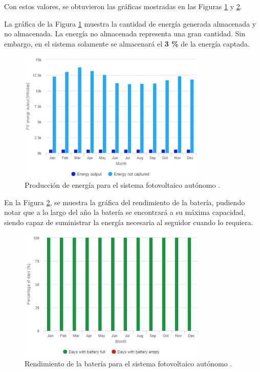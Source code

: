 \begin{itemize}
	Con estos valores, se obtuvieron las gráficas mostradas en las Figuras \ref{fig:batgraf1} y \ref{fig:batgraf2}.
	
	
	La gráfica de la Figura \ref{fig:batgraf1} muestra la cantidad de energía generada almacenada y no almacenada. La energía no almacenada representa una gran cantidad. Sin embargo, en el sistema solamente se almacenará el \textbf{3 \%} de la energía captada. 
	
	\begin{figure}[H]
		\centering
		\includegraphics[width=9cm]{imagenes/batgraf}
		\caption{Producción de energía para el sistema fotovoltaico autónomo \cite{DDE3}.}
		\label{fig:batgraf1}
	\end{figure}

	En la Figura \ref{fig:batgraf2}, se muestra la gráfica del rendimiento de la batería, pudiendo notar que a lo largo del año la batería se encontrará a su máxima capacidad, siendo capaz de suministrar la energía necesaria al seguidor cuando lo requiera.

	\begin{figure}[H]
		\centering
		\includegraphics[width=9cm]{imagenes/batgraf2}
		\caption{Rendimiento de la batería para el sistema fotovoltaico autónomo \cite{DDE3}.}
		\label{fig:batgraf2}
	\end{figure}
	

\end{itemize}
